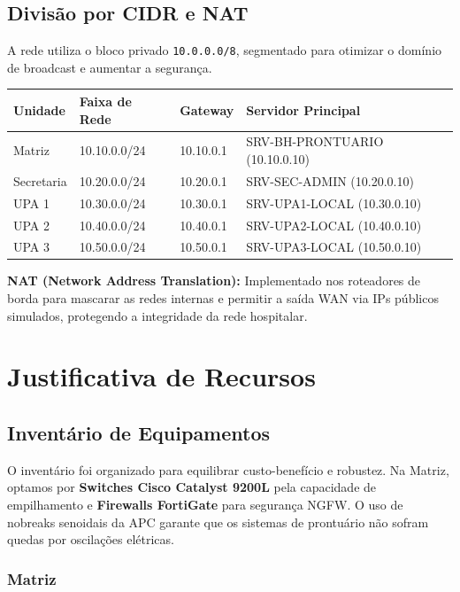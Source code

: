 \documentclass[12pt,a4paper,oneside]{report}
\begin{document}
\subsection{Divisão por CIDR e NAT}
A rede utiliza o bloco privado \texttt{10.0.0.0/8}, segmentado para otimizar o domínio de broadcast e aumentar a segurança.
\begin{center}
\footnotesize
\begin{tabular}{llll}
\toprule
\textbf{Unidade} & \textbf{Faixa de Rede} & \textbf{Gateway} & \textbf{Servidor Principal} \\ \midrule
Matriz     & 10.10.0.0/24 & 10.10.0.1 & SRV-BH-PRONTUARIO (10.10.0.10) \\
Secretaria & 10.20.0.0/24 & 10.20.0.1 & SRV-SEC-ADMIN (10.20.0.10) \\
UPA 1      & 10.30.0.0/24 & 10.30.0.1 & SRV-UPA1-LOCAL (10.30.0.10) \\
UPA 2      & 10.40.0.0/24 & 10.40.0.1 & SRV-UPA2-LOCAL (10.40.0.10) \\
UPA 3      & 10.50.0.0/24 & 10.50.0.1 & SRV-UPA3-LOCAL (10.50.0.10) \\
\bottomrule
\end{tabular}
\end{center}

\textbf{NAT (Network Address Translation):} Implementado nos roteadores de borda para mascarar as redes internas e permitir a saída WAN via IPs públicos simulados, protegendo a integridade da rede hospitalar.

\section{Justificativa de Recursos}

\subsection{Inventário de Equipamentos}

O inventário foi organizado para equilibrar custo-benefício e robustez. Na Matriz, optamos por \textbf{Switches Cisco Catalyst 9200L} pela capacidade de empilhamento e \textbf{Firewalls FortiGate} para segurança NGFW. O uso de nobreaks senoidais da APC garante que os sistemas de prontuário não sofram quedas por oscilações elétricas.

\subsubsection{Matriz}
\end{document}
